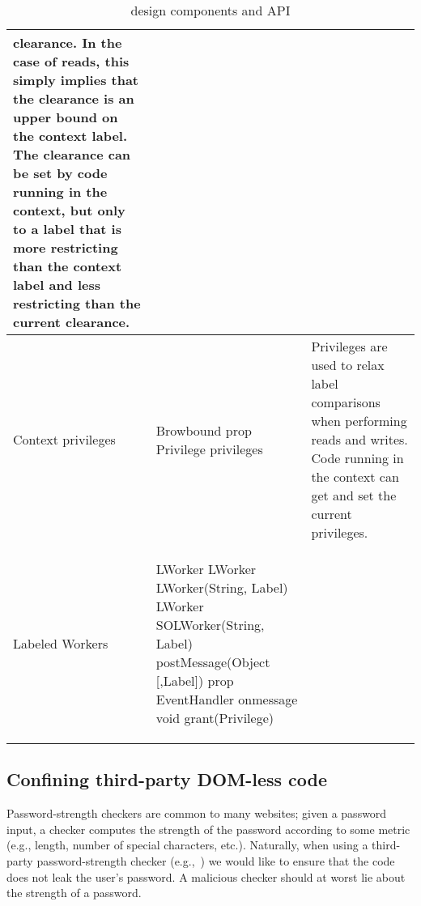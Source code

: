 \begin{table*}[t]
\begin{tabular}{l | m{2.35in} | m{3.5in}}
clearance.
%
In the case of reads, this simply implies that the clearance is an
upper bound on the context label.
%
The clearance can be set by code running in the context, but only to a
label that is more restricting than the context label and less
restricting than the current clearance.
\\\hline %
Context privileges  &  
\begin{webidl}
Browbound {
  prop Privilege privileges
}
\end{webidl}
&
Privileges are used to relax label comparisons when performing reads
and writes.
%
Code running in the context can get and set the current privileges.
\\\hline %
Labeled Workers  &  
\begin{webidl}
LWorker {
  LWorker LWorker(String, Label)
  LWorker SOLWorker(String, Label)
  postMessage(Object [,Label])
  prop EventHandler onmessage
  void grant(Privilege)
}
\end{webidl}
&
\\\hline %
\end{tabular}
\caption{\sys{} design components and API}
\end{table*}


\subsection{Confining third-party DOM-less code}
\label{sec:system:worker}

Password-strength checkers are common to many websites;
%
given a password input, a checker computes the strength of the
password according to some metric (e.g., length, number of special
characters, etc.).
%
Naturally, when using a third-party password-strength checker
(e.g.,~) we would like to ensure that the
code does not leak the user's password.
%
A malicious checker should at worst lie about the strength of a
password.


